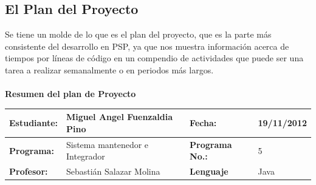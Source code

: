 \documentclass[a4paper,12pt,openany,oneside]{book}
\begin{document}
\subsection{El Plan del Proyecto}
Se tiene un molde de lo que es el plan del proyecto, que es la parte más consistente del desarrollo en PSP, ya que nos muestra información acerca de tiempos por líneas de código en un compendio de actividades que puede ser una tarea a realizar semanalmente o en periodos más largos.
\\\\
\textbf{Resumen del plan de Proyecto}\\
\begin{tabular}{| l | l | l | l |}
\hline
\textbf{Estudiante:} & Miguel Angel Fuenzaldia Pino & \textbf{Fecha:} & 19/11/2012\\
\hline
\textbf{Programa:} & Sistema mantenedor e Integrador & \textbf{Programa No.:} & 5\\
\hline
\textbf{Profesor:} & Sebastián Salazar Molina & \textbf{Lenguaje} & Java  \\
\hline
\end{tabular}
\\\\\\
\end{document}
